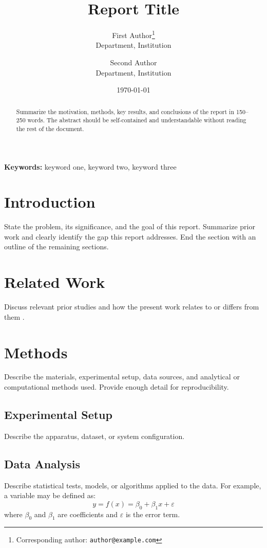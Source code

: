 \documentclass[11pt, a4paper]{article}
\title{Report Title}
\author{
    First Author\thanks{Corresponding author: \texttt{author@example.com}} \\
    Department, Institution
    \and
    Second Author \\
    Department, Institution
}
\date{\today}
\begin{document}
\maketitle

\begin{abstract}
Summarize the motivation, methods, key results, and conclusions of the
report in 150--250 words. The abstract should be self-contained and
understandable without reading the rest of the document.
\end{abstract}

\noindent\textbf{Keywords:} keyword one, keyword two, keyword three

\tableofcontents
\newpage

\section{Introduction}
\label{sec:introduction}

State the problem, its significance, and the goal of this report. Summarize
prior work and clearly identify the gap this report addresses. End the
section with an outline of the remaining sections.

\section{Related Work}
\label{sec:related-work}

Discuss relevant prior studies and how the present work relates to or
differs from them \citep{example2024}.

\section{Methods}
\label{sec:methods}

Describe the materials, experimental setup, data sources, and analytical or
computational methods used. Provide enough detail for reproducibility.

\subsection{Experimental Setup}
Describe the apparatus, dataset, or system configuration.

\subsection{Data Analysis}
Describe statistical tests, models, or algorithms applied to the data.
For example, a variable may be defined as:
\begin{equation}
    \label{eq:example}
    y = f(x) = \beta_0 + \beta_1 x + \varepsilon
\end{equation}
where $\beta_0$ and $\beta_1$ are coefficients and $\varepsilon$ is the
error term.
\end{document}
